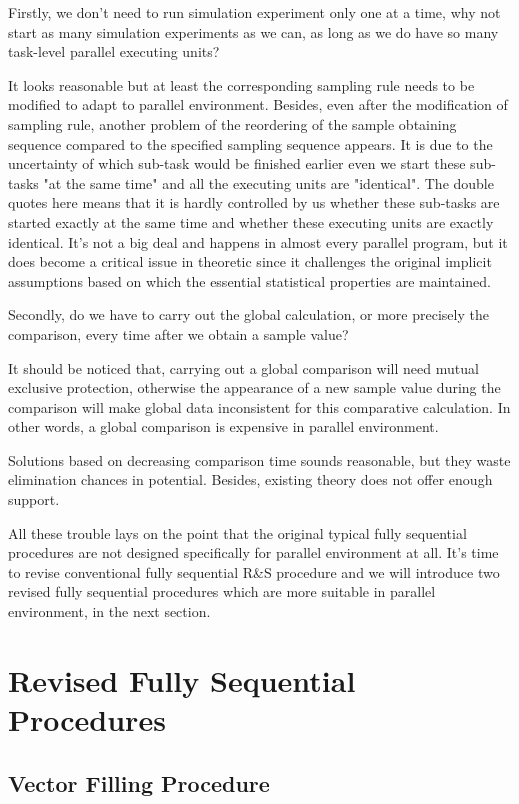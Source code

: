 \documentclass[12pt,a4paper]{report}
\begin{document}
Firstly, we don't need to run simulation experiment only one at a time, why not start as many simulation experiments as we can, as long as we do have so many task-level parallel executing units?

It looks reasonable but at least the corresponding sampling rule needs to be modified to adapt to parallel environment. Besides, even after the modification of sampling rule, another problem of the reordering of the sample obtaining sequence compared to the specified sampling sequence appears. It is due to the uncertainty of which sub-task would be finished earlier even we start these sub-tasks "at the same time" and all the executing units are "identical". The double quotes here means that it is hardly controlled by us whether these sub-tasks are started exactly at the same time and whether these executing units are exactly identical. It's not a big deal and happens in almost every parallel program, but it does become a critical issue in theoretic since it challenges the original implicit assumptions based on which the essential statistical properties are maintained.

Secondly, do we have to carry out the global calculation, or more precisely the comparison, every time after we obtain a sample value?

It should be noticed that, carrying out a global comparison will need mutual exclusive protection, otherwise the appearance of a new sample value during the comparison will make global data inconsistent for this comparative calculation. In other words, a global comparison is expensive in parallel environment.

Solutions based on decreasing comparison time sounds reasonable, but they waste elimination chances in potential. Besides, existing theory does not offer enough support.

All these trouble lays on the point that the original typical fully sequential procedures are not designed specifically for parallel environment at all. It's time to revise conventional fully sequential R\&S procedure and we will introduce two revised fully sequential procedures which are more suitable in parallel environment, in the next section.

\section{Revised Fully Sequential Procedures}

\subsection{Vector Filling Procedure}
\end{document}
